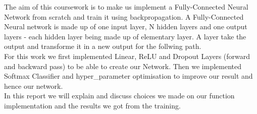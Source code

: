 The aim of this coursework is to make us implement a Fully-Connected Neural Network from scratch and train it using backpropagation. 
A Fully-Connected Neural network is made up of one input layer, N hidden layers and one output layers - each hidden layer being made up of elementary layer.
A layer take the output and transforme it in a new output for the follwing path. \\
For this work we first implemented Linear, ReLU and Dropout Layers (forward and backward pass) to be able to create our Network. Then we implemented Softmax Classifier and hyper_parameter optimisation to improve our result and hence our network. \\
In this report we will explain and discuss choices we made on our function implementation and the results we got from the training.

